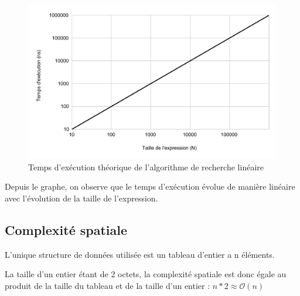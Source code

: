 \begin{figure}[H]
    \centering
        \includegraphics[scale=0.5]{./ressources/temps_execution_th_algo2.pdf}
        \caption{Temps d'exécution théorique de l'algorithme de recherche linéaire}
    \label{fig:temps_exec_th_algo2}
\end{figure} 

Depuis le graphe,  on observe que le temps d'exécution évolue de manière linéaire avec l'évolution de la taille de l'expression.


\subsection{Complexité spatiale}
\par
L'unique structure de données utilisée est un tableau d'entier a n éléments. 
\par
La taille d'un entier étant de 2 octets, la complexité spatiale est donc égale au produit de la taille du tableau et de la taille d'un entier : $n * 2 \approx \mathcal{O}(n)$
\par

